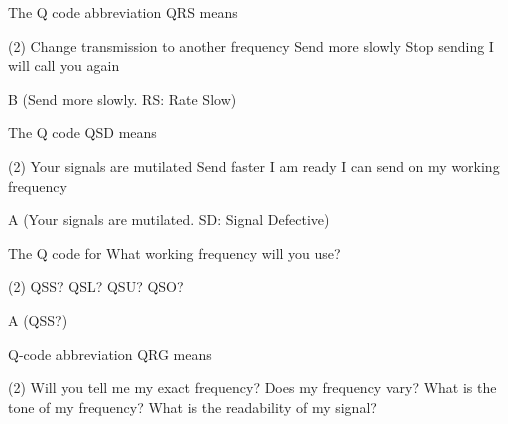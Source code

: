 \documentclass[a4paper]{article}
\begin{document}
\begin{question}The Q code abbreviation QRS means
	\begin{tasks}(2)
		\task Change transmission to another frequency
		\task Send more slowly
		\task Stop sending
		\task I will call you again
	\end{tasks}
\end{question}

\begin{solution}
	B (Send more slowly. RS: Rate Slow)
\end{solution}

\vspace{5mm}



\begin{question}The Q code QSD means
	\begin{tasks}(2)
		\task Your signals are mutilated
		\task Send faster
		\task I am ready
		\task I can send on my working frequency
	\end{tasks}
\end{question}

\begin{solution}
	A (Your signals are mutilated. SD: Signal Defective)
\end{solution}

\vspace{5mm}



\begin{question}The Q code for \apostrophe{}What working frequency will you use?\apostrophe{}
	\begin{tasks}(2)
		\task QSS?
		\task QSL?
		\task QSU?
		\task QSO?
	\end{tasks}
\end{question}

\begin{solution}
	A (QSS?)
\end{solution}

\vspace{5mm}



\begin{question}Q-code abbreviation \apostrophe{}QRG\apostrophe{} means
	\begin{tasks}(2)
		\task Will you tell me my exact frequency?
		\task Does my frequency vary?
		\task What is the tone of my frequency?
		\task What is the readability of my signal?
	\end{tasks}
\end{question}
\end{document}
